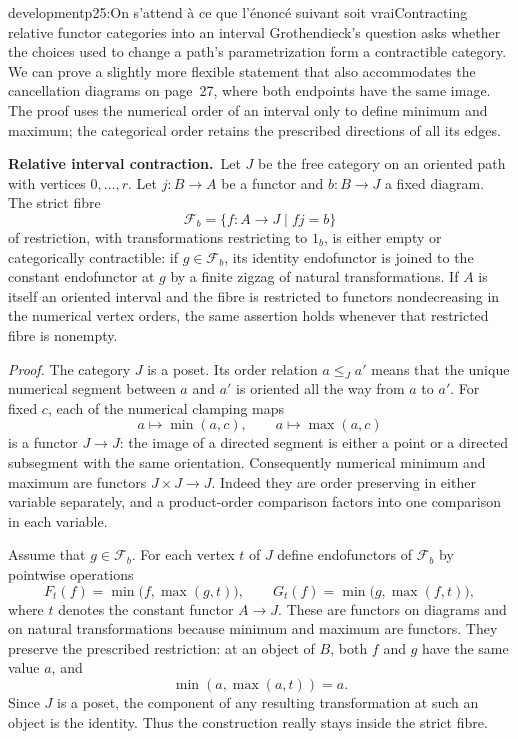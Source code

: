 \begin{dcomment}{development}{p25:On s'attend à ce que l'énoncé suivant soit vrai}{Contracting relative functor categories into an interval}
Grothendieck's question asks whether the choices used to change a path's parametrization form a contractible category. We can prove a slightly more flexible statement that also accommodates the cancellation diagrams on page~27, where both endpoints have the same image. The proof uses the numerical order of an interval only to define minimum and maximum; the categorical order retains the prescribed directions of all its edges.

\textbf{Relative interval contraction.}\ours\ Let $J$ be the free category on an oriented path with vertices $0,\ldots,r$. Let $j:B\to A$ be a functor and $b:B\to J$ a fixed diagram. The strict fibre
\[
 \mathcal F_b=
 \{f:A\to J\mid fj=b\}
\]
of restriction, with transformations restricting to $1_b$, is either empty or categorically contractible: if $g\in\mathcal F_b$, its identity endofunctor is joined to the constant endofunctor at $g$ by a finite zigzag of natural transformations. If $A$ is itself an oriented interval and the fibre is restricted to functors nondecreasing in the numerical vertex orders, the same assertion holds whenever that restricted fibre is nonempty.

\emph{Proof.} The category $J$ is a poset. Its order relation $a\leq_J a'$ means that the unique numerical segment between $a$ and $a'$ is oriented all the way from $a$ to $a'$. For fixed $c$, each of the numerical clamping maps
\[
 a\longmapsto\min(a,c),\qquad
 a\longmapsto\max(a,c)
\]
is a functor $J\to J$: the image of a directed segment is either a point or a directed subsegment with the same orientation. Consequently numerical minimum and maximum are functors $J\times J\to J$. Indeed they are order preserving in either variable separately, and a product-order comparison factors into one comparison in each variable.

Assume that $g\in\mathcal F_b$. For each vertex $t$ of $J$ define endofunctors of $\mathcal F_b$ by pointwise operations
\[
 F_t(f)=\min\bigl(f,\max(g,t)\bigr),\qquad
 G_t(f)=\min\bigl(g,\max(f,t)\bigr),
\]
where $t$ denotes the constant functor $A\to J$. These are functors on diagrams and on natural transformations because minimum and maximum are functors. They preserve the prescribed restriction: at an object of $B$, both $f$ and $g$ have the same value $a$, and
\[
 \min(a,\max(a,t))=a.
\]
Since $J$ is a poset, the component of any resulting transformation at such an object is the identity. Thus the construction really stays inside the strict fibre.


\end{dcomment}
